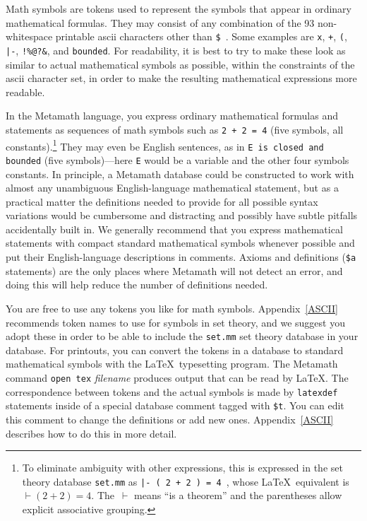 Math symbols are tokens used to represent the symbols
that appear in ordinary mathematical formulas.  They may consist of any
combination of the 93 non-whitespace printable {\sc ascii} characters other than
\texttt{\$}~. Some examples are \texttt{x}, \texttt{+}, \texttt{(},
\texttt{|-}, \verb$!%@?&$, and \texttt{bounded}.  For readability, it is
best to try to make these look as similar to actual mathematical symbols
as possible, within the constraints of the {\sc ascii} character set, in
order to make the resulting mathematical expressions more readable.

In the Metamath language, you express ordinary
mathematical formulas and statements as sequences of math symbols such
as \texttt{2 + 2 = 4} (five symbols, all constants).\footnote{To
eliminate ambiguity with other expressions, this is expressed in the set
theory database \texttt{set.mm} as \texttt{|- ( 2 + 2
 ) = 4 }, whose \LaTeX\ equivalent is $\vdash
(2+2)=4$.  The \,$\vdash$ means ``is a theorem'' and the
parentheses allow explicit associative grouping.} They may even be English
sentences, as in \texttt{E is closed and bounded} (five symbols)---here
\texttt{E} would be a variable and the other four symbols constants.  In
principle, a Metamath database could be constructed to work with almost
any unambiguous English-language mathematical statement, but as a
practical matter the definitions needed to provide for all possible
syntax variations would be cumbersome and distracting and possibly have
subtle pitfalls accidentally built in.  We generally recommend that you
express mathematical statements with compact standard mathematical
symbols whenever possible and put their English-language descriptions in
comments.  Axioms and definitions
(\texttt{\$a} statements) are the only
places where Metamath will not detect an error, and doing this will help
reduce the number of definitions needed.

You are free to use any tokens you like for math
symbols.  Appendix~\ref{ASCII} recommends token names to
use for symbols in set theory, and we suggest you adopt these in order to be
able to include the \texttt{set.mm} set theory database in your database.  For
printouts, you can convert the tokens in a database
to standard mathematical symbols with the \LaTeX\ typesetting program.  The
Metamath command \texttt{open tex} {\em filename}
produces output that can be read by \LaTeX.
The correspondence
between tokens and the actual symbols is made by \texttt{latexdef}
statements inside of a special database comment tagged
with \texttt{\$t}.
  You can edit
this comment to change the definitions or add new ones.
Appendix~\ref{ASCII} describes how to do this in more detail.

